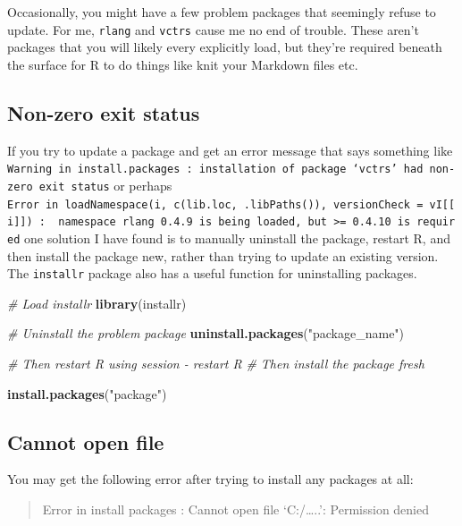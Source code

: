 \documentclass[
  oneside]{book}
\newenvironment{Shaded}{\begin{snugshade}}{\end{snugshade}}
\newcommand{\CommentTok}[1]{\textcolor[rgb]{0.56,0.35,0.01}{\textit{#1}}}
\newcommand{\FunctionTok}[1]{\textcolor[rgb]{0.13,0.29,0.53}{\textbf{#1}}}
\newcommand{\NormalTok}[1]{#1}
\newcommand{\StringTok}[1]{\textcolor[rgb]{0.31,0.60,0.02}{#1}}
\begin{document}
Occasionally, you might have a few problem packages that seemingly refuse to update. For me, \texttt{rlang} and \texttt{vctrs} cause me no end of trouble. These aren't packages that you will likely every explicitly load, but they're required beneath the surface for R to do things like knit your Markdown files etc.

\hypertarget{non-zero-exit-status}{%
\subsection{Non-zero exit status}\label{non-zero-exit-status}}

If you try to update a package and get an error message that says something like \texttt{Warning\ in\ install.packages\ :\ installation\ of\ package\ ‘vctrs’\ had\ non-zero\ exit\ status} or perhaps \texttt{Error\ in\ loadNamespace(i,\ c(lib.loc,\ .libPaths()),\ versionCheck\ =\ vI{[}{[}i{]}{]})\ :\ \ namespace\ \textquotesingle{}rlang\textquotesingle{}\ 0.4.9\ is\ being\ loaded,\ but\ \textgreater{}=\ 0.4.10\ is\ required} one solution I have found is to manually uninstall the package, restart R, and then install the package new, rather than trying to update an existing version. The \texttt{installr} package also has a useful function for uninstalling packages.

\begin{Shaded}
\begin{Highlighting}[]
\CommentTok{\# Load installr}
\FunctionTok{library}\NormalTok{(installr)}

\CommentTok{\# Uninstall the problem package}
\FunctionTok{uninstall.packages}\NormalTok{(}\StringTok{"package\_name"}\NormalTok{)}

\CommentTok{\# Then restart R using session {-} restart R}
\CommentTok{\# Then install the package fresh}

\FunctionTok{install.packages}\NormalTok{(}\StringTok{"package"}\NormalTok{)}
\end{Highlighting}
\end{Shaded}

\hypertarget{cannot-open-file}{%
\subsection{Cannot open file}\label{cannot-open-file}}

You may get the following error after trying to install any packages at all:

\begin{quote}
Error in install packages : Cannot open file `C:/\ldots..': Permission denied
\end{quote}
\end{document}
